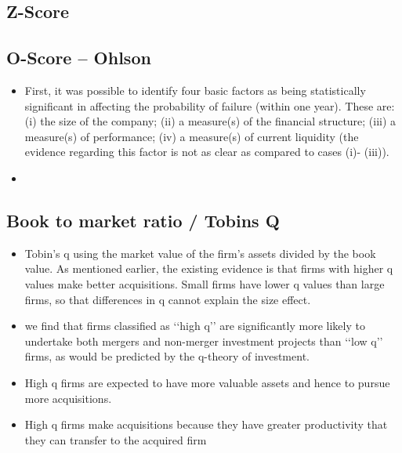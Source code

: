 \documentclass[12pt]{article}
\begin{document}
\subsection{Z-Score}
\subsection{O-Score -- Ohlson}

    \begin{itemize}
        \item First, it was possible to identify four basic factors as being statistically significant in affecting the probability of failure (within one year). These are: (i) the size of the company; (ii) a measure(s) of the financial structure; (iii) a measure(s) of performance; (iv) a measure(s) of current liquidity (the evidence regarding this factor is not as clear as compared to cases (i)- (iii)). \citep{Ohlson1980}
        \item 
    \end{itemize}
\subsection{Book to market ratio / Tobins Q}

    \begin{itemize}
        \item Tobin’s q using the market value of the firm’s assets divided by the book value. As mentioned earlier, the existing evidence is that firms with higher q values make better acquisitions. Small firms have lower q values than large firms, so that differences in q cannot explain the size effect. \citep{Moeller2004}

        \item we find that firms classified as ‘‘high q’’ are significantly more likely to undertake both mergers and non-merger investment projects than ‘‘low q’’ firms, as would be predicted by the q-theory of investment. 

        \item High q firms are expected to have more valuable assets and hence to pursue more acquisitions. \citep{Arikan2016}

        \item High q firms make acquisitions because they have greater productivity that they can transfer to the acquired firm \citep{Arikan2016}

    \end{itemize}
\end{document}
